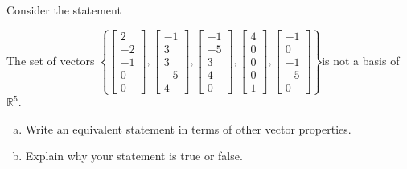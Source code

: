 
\begin{exerciseStatement}


Consider the statement 
\begin{center}\begin{minipage}{0.8\textwidth}
 The set of vectors \( \left\{ \left[\begin{array}{c}
2 \\
-2 \\
-1 \\
0 \\
0
\end{array}\right] , \left[\begin{array}{c}
-1 \\
3 \\
3 \\
-5 \\
4
\end{array}\right] , \left[\begin{array}{c}
-1 \\
-5 \\
3 \\
4 \\
0
\end{array}\right] , \left[\begin{array}{c}
4 \\
0 \\
0 \\
0 \\
1
\end{array}\right] , \left[\begin{array}{c}
-1 \\
0 \\
-1 \\
-5 \\
0
\end{array}\right] \right\} \)is not a basis of \(\mathbb{R}^5\). 
\end{minipage}\end{center}
    


\begin{enumerate}[(a)]
\item  Write an equivalent statement in terms of other vector properties.
\item  Explain why your statement is true or false.
\end{enumerate}
    
\end{exerciseStatement}
    
